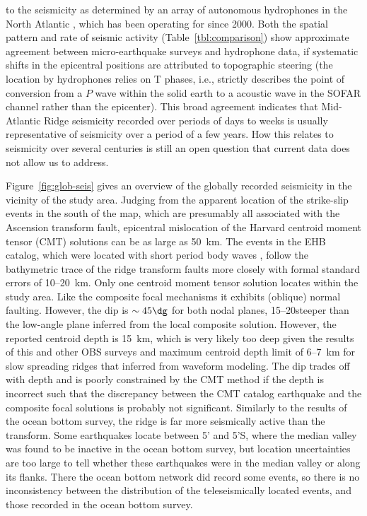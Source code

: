 \documentclass[jgr]{agu2001}
\newlength{\tw}
\begin{document}
\begin{article}
to the seismicity as determined by an array of autonomous hydrophones
in the North Atlantic \citep{smith03}, which has been operating for
since 2000. Both the spatial pattern
\citep[Fig.~13 of ][]{smith03} and rate of seismic
activity (Table~\ref{tbl:comparison}) show approximate agreement between
micro-earthquake surveys and hydrophone data, if systematic shifts in
the epicentral positions are attributed to topographic steering (the
location by hydrophones relies on T phases, i.e., strictly describes the
point of conversion from a $P$ wave within the solid earth to a
acoustic wave in the SOFAR channel rather than the epicenter).  This broad agreement indicates that
Mid-Atlantic Ridge seismicity recorded over periods of days to weeks is
usually representative of seismicity over a period of a few years.
How this relates to seismicity over several centuries is still
an open question that current data does not allow us to address.

Figure~\ref{fig:glob-seis} gives an overview of the globally recorded
seismicity in the vicinity of the study area. Judging from the
apparent location of the strike-slip events in the south of the map,
which are presumably all associated with the Ascension transform
fault, epicentral mislocation of the Harvard centroid moment tensor (CMT) solutions
\citep{dziewonski81a} can be as large as 50~km. The events 
in the EHB catalog, which were located with short period body waves
\citep{engdahl98}, follow the bathymetric trace of the ridge  transform
faults more closely with formal standard errors of 10--20~km.  Only
one centroid moment tensor solution locates within the study
area. Like the composite focal mechanisms it exhibits (oblique) normal
faulting. However, the dip is $\sim 45\dg$ for both nodal planes,
15--20\dg steeper than the low-angle plane inferred from the local
composite solution. However, the reported centroid depth is 15~km,
which is very likely too deep given the results of this and other OBS
surveys and  maximum centroid depth limit
of 6--7~km for slow spreading ridges that \citet{huang88} inferred  from waveform modeling. 
The dip trades off with depth and is poorly constrained by the CMT
method if the depth is incorrect
\citep{dziewonski81a} such that
the discrepancy between the CMT catalog earthquake and the composite focal
solutions is probably not significant. Similarly to the results of the
ocean bottom survey, the ridge is far more seismically active than the
transform.  Some earthquakes locate between 5' and 5'S,
where the median valley  was found to be inactive in the ocean bottom
survey, but location uncertainties are too large to tell whether these
earthquakes were in the median valley or along its flanks. There the
ocean bottom network did record some events, so there is no
inconsistency between the distribution of the teleseismically located
events, and those recorded in the ocean bottom
survey.


\end{article}
\end{document}
